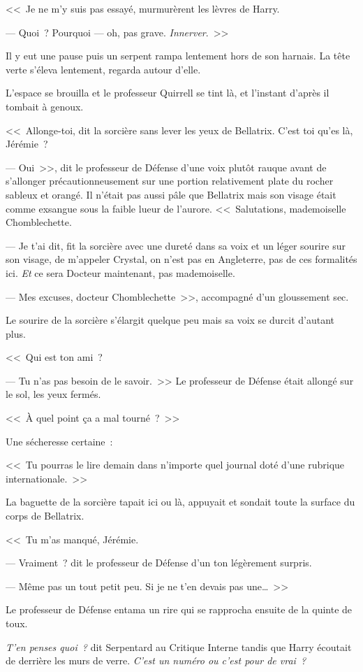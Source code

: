 <<~Je ne m'y suis pas essayé, murmurèrent les lèvres de Harry.

--- Quoi~? Pourquoi — oh, pas grave. \emph{Innerver}.~>>

Il y eut une pause puis un serpent rampa lentement hors de son harnais. La tête verte s'éleva lentement, regarda autour d'elle.

L'espace se brouilla et le professeur Quirrell se tint là, et l'instant d'après il tombait à genoux.

<<~Allonge-toi, dit la sorcière sans lever les yeux de Bellatrix. C'est toi qu'es là, Jérémie~?

--- Oui~>>, dit le professeur de Défense d'une voix plutôt rauque avant de s'allonger précautionneusement sur une portion relativement plate du rocher sableux et orangé. Il n'était pas aussi pâle que Bellatrix mais son visage était comme exsangue sous la faible lueur de l'aurore. <<~Salutations, mademoiselle Chomblechette.

--- Je t'ai dit, fit la sorcière avec une dureté dans sa voix et un léger sourire sur son visage, de m'appeler Crystal, on n'est pas en Angleterre, pas de ces formalités ici. \emph{Et} ce sera Docteur maintenant, pas mademoiselle.

--- Mes excuses, docteur Chomblechette~>>, accompagné d'un gloussement sec.

Le sourire de la sorcière s'élargit quelque peu mais sa voix se durcit d'autant plus.

<<~Qui est ton ami~?

--- Tu n'as pas besoin de le savoir.~>> Le professeur de Défense était allongé sur le sol, les yeux fermés.

<<~À quel point ça a mal tourné~?~>>

Une sécheresse certaine~:

<<~Tu pourras le lire demain dans n'importe quel journal doté d'une rubrique internationale.~>>

La baguette de la sorcière tapait ici ou là, appuyait et sondait toute la surface du corps de Bellatrix.

<<~Tu m'as manqué, Jérémie.

--- Vraiment~? dit le professeur de Défense d'un ton légèrement surpris.

--- Même pas un tout petit peu. Si je ne t'en devais pas une…~>>

Le professeur de Défense entama un rire qui se rapprocha ensuite de la quinte de toux.

\emph{T'en penses quoi~?} dit Serpentard au Critique Interne tandis que Harry écoutait de derrière les murs de verre. \emph{C'est un numéro ou c'est pour de vrai~?}

